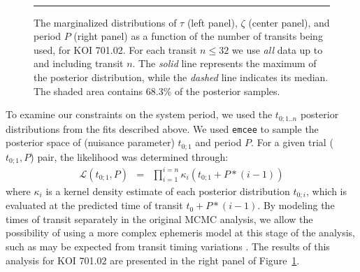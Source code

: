 \begin{figure}[t] 
\begin{center} 
\mbox{
\quad
{}
\quad
{}
}
\caption{The marginalized distributions of $\tau$ (left panel),
  $\zeta$ (center panel), and period $P$ (right panel) as a function
  of the number of transits being used, for KOI 701.02.  For each
  transit $n \leq 32$ we use {\it all} data up to and including
  transit $n$.  The {\it solid} line
  represents the maximum of the posterior distribution, while the {\it
  dashed} line indicates its median.  The shaded area contains 68.3\%
  of the posterior samples.}
\hspace*{\fill}  
\hrule
\label{fig-marg} 
\end{center} 
\end{figure}

To examine our constraints on the system period, we used the
$t_{0;1..n}$ posterior distributions from the fits described above.
We used {\tt emcee} to sample the posterior space of (nuisance
parameter) $t_{0;1}$ and period $P$.  For a given trial ($t_{0;1}, P$)
pair, the likelihood was determined through:
\begin{eqnarray}
\mathcal{L}(t_{0;1}, P) & = & \prod_{i=1}^{i=n} \kappa_i(t_{0;1} + P * (i-1))
\end{eqnarray}
where $\kappa_i$ is a kernel density estimate of each posterior
distribution $t_{0;i}$, which is evaluated at the predicted time of
transit $t_0 + P * (i-1)$.  By modeling the times of transit
separately in the original MCMC analysis, we allow the possibility of
using a more complex ephemeris model at this stage of the analysis,
such as may be expected from transit timing variations
\citep{2005MNRAS.359..567A,2005Sci...307.1288H}.  The results of this
analysis for KOI 701.02 are presented in the right panel of
Figure~\ref{fig-marg}.

